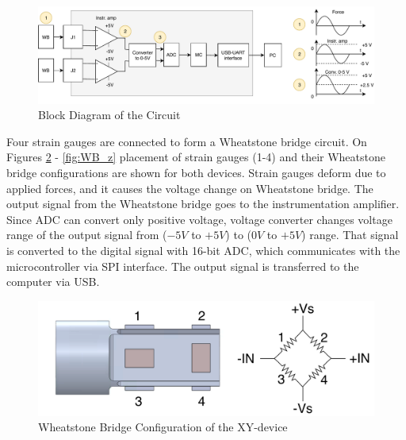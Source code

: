\begin{figure}[h]
	\begin{center}
	\includegraphics[width=150mm]{fig/methods/PSC_block_wave.pdf}
	\end{center}
	\vspace{-4mm}
	\caption[Block Diagram of the Circuit]
	{Block Diagram of the Circuit}
	\label{fig:PCB_bd}
	\vspace{-2mm}
\end{figure}

Four strain gauges are connected to form a Wheatstone bridge circuit. On Figures \ref{fig:WB_xy_dev} - \ref{fig:WB_z} placement of strain gauges (1-4) and their Wheatstone bridge configurations are shown for both devices. Strain gauges deform due to applied forces, and it causes the voltage change on Wheatstone bridge. The output signal from the Wheatstone bridge goes to the instrumentation amplifier. Since ADC can convert only positive voltage, voltage converter changes voltage range of the output signal from ($-5V$ to $+5V$) to ($0V$ to $+5V$) range. That signal is converted to the digital signal with 16-bit ADC, which communicates with the microcontroller via SPI interface. The output signal is transferred to the computer via USB. 
	
\begin{figure}[h]
	\begin{center}
		\includegraphics[width=120mm]{fig/methods/Wiring_xy_sleeve.pdf}
	\end{center}
	\vspace{-4mm}
	\caption[Wheatstone Bridge Configuration of the XY-device]
	{Wheatstone Bridge Configuration of the XY-device}
	\label{fig:WB_xy_dev}
	\vspace{-2mm}
\end{figure}


